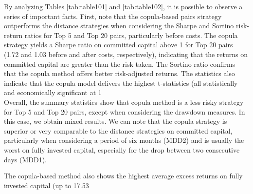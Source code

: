 \documentclass[a4paper]{article}
\begin{document}
By analyzing Tables \ref{tab:table101} and \ref{tab:table102}, it is possible to observe a series of important facts. First, note that the copula-based pairs strategy outperforms the distance strategies when considering the Sharpe and Sortino risk-return ratios for Top 5 and Top 20 pairs, particularly before costs. The copula strategy yields a Sharpe ratio on committed capital above 1 for Top 20 pairs (1.72 and 1.03 before and after costs, respectively), indicating that the returns on committed capital are greater than the risk taken. The Sortino ratio confirms that the copula method offers better risk-adjusted returns. The statistics also indicate that the copula model delivers the highest t-statistics (all statistically and economically significant at 1\\%

Overall, the summary statistics show that copula method is a less risky strategy for Top 5 and Top 20 pairs, except when considering the drawdown measures. In this case, we obtain mixed results. We can note that the copula strategy is superior or very comparable to the distance strategies on committed capital, particularly when considering a period of six months (MDD2) and is usually the worst on fully invested capital, especially for the drop between two consecutive days (MDD1).

The copula-based method also shows the highest average excess returns on fully invested capital (up to 17.53\\%

	
	
\end{document}
